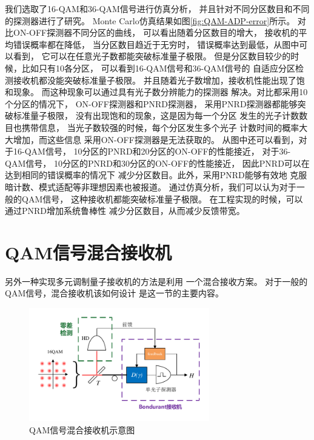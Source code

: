  
我们选取了16-QAM和36-QAM信号进行仿真分析，
并且针对不同分区数目和不同的探测器进行了研究。
Monte Carlo仿真结果如图\ref{fig:QAM-ADP-error}所示。
对比ON-OFF探测器不同分区的曲线，
可以看出随着分区数目的增大，
接收机的平均错误概率都在降低，
当分区数目趋近于无穷时，
错误概率达到最低，从图中可以看到，
它可以在任意光子数都能突破标准量子极限。
但是分区数目较少的时候，比如只有10各分区，
可以看到16-QAM信号和36-QAM信号的
自适应分区检测接收机都没能突破标准量子极限。
并且随着光子数增加，接收机性能出现了饱和现象。
而这种现象可以通过具有光子数分辨能力的探测器
解决。对比都采用10个分区的情况下，
ON-OFF探测器和PNRD探测器，
采用PNRD探测器都能够突破标准量子极限，
没有出现饱和的现象，这是因为每一个分区
发生的光子计数数目也携带信息，
当光子数较强的时候，每个分区发生多个光子
计数时间的概率大大增加，而这些信息
采用ON-OFF探测器是无法获取的。
从图中还可以看到，对于16-QAM信号，
10分区的PNRD和20分区的ON-OFF的性能接近，
对于36-QAM信号，
10分区的PNRD和30分区的ON-OFF的性能接近，
因此PNRD可以在达到相同的错误概率的情况下
减少分区数目。此外，采用PNRD能够有效地
克服暗计数、模式适配等非理想因素也被报道\cite{izumi2013quantum, li2013suppressing}。
通过仿真分析，我们可以认为对于一般的QAM信号，
这种接收机都能突破标准量子极限。
在工程实现的时候，可以通过PNRD增加系统鲁棒性
减少分区数目，从而减少反馈带宽。






\section{QAM信号混合接收机}
另外一种实现多元调制量子接收机的方法是利用
一个混合接收方案\cite{muller2012quadrature,李科2014}。
对于一般的QAM信号，混合接收机该如何设计
是这一节的主要内容。

\begin{figure}
\centering
  \includegraphics[width=0.7\textwidth]{figures/chap3/QAM-Hybrid-receiver}
  \caption{QAM信号混合接收机示意图}
  \label{fig:QAM-Hybrid-receiver}
\end{figure}

